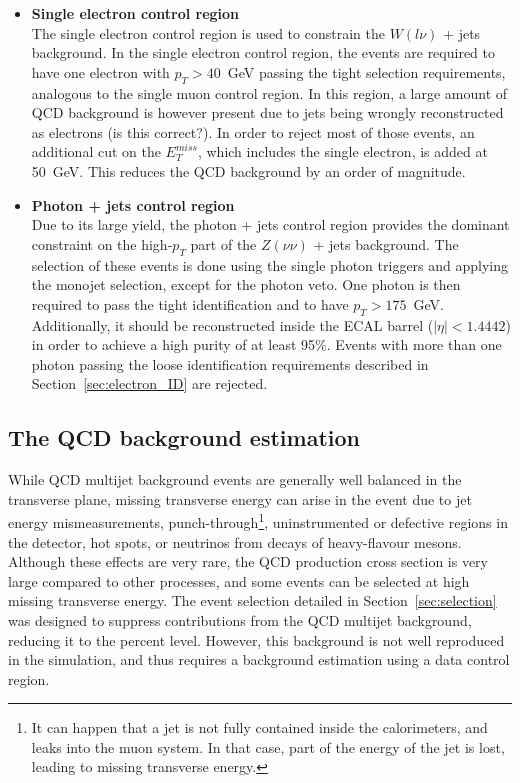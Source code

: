 \begin{itemize}
\item[] \textbf{Single electron control region}\\ The single electron control region is used to constrain the $W(l\nu)$ + jets background. In the single electron control region, the events are required to have one electron with $p_T > 40$~GeV passing the tight selection requirements, analogous to the single muon control region. In this region, a large amount of QCD background is however present due to jets being wrongly reconstructed as electrons {\color{red} (is this correct?)}. In order to reject most of those events, an additional cut on the $E_T^{miss}$, which includes the single electron, is added at 50~GeV. This reduces the QCD background by an order of magnitude.

\item[] \textbf{Photon + jets control region}\\Due to its large yield, the photon + jets control region provides the dominant constraint on the high-$p_T$ part of the $Z(\nu\nu)$ + jets background. The selection of these events is done using the single photon triggers and applying the monojet selection, except for the photon veto. One photon is then required to pass the tight identification and to have $p_T > 175$~GeV. Additionally, it should be reconstructed inside the \ac{ECAL} barrel ($|\eta| < 1.4442$) in order to achieve a high purity of at least 95\%. Events with more than one photon passing the loose identification requirements described in Section~\ref{sec:electron_ID} are rejected.
\end{itemize}

\subsection{The QCD background estimation}

While QCD multijet background events are generally well balanced in the transverse plane, missing transverse energy can arise in the event due to jet energy mismeasurements, punch-through\footnote{It can happen that a jet is not fully contained inside the calorimeters, and leaks into the muon system. In that case, part of the energy of the jet is lost, leading to missing transverse energy.}, uninstrumented or defective regions in the detector, hot spots, or neutrinos from decays of heavy-flavour mesons. Although these effects are very rare, the QCD production cross section is very large compared to other processes, and some events can be selected at high missing transverse energy. The event selection detailed in Section~\ref{sec:selection} was designed to suppress contributions from the QCD multijet background, reducing it to the percent level. However, this background is not well reproduced in the simulation, and thus requires a background estimation using a data control region.

